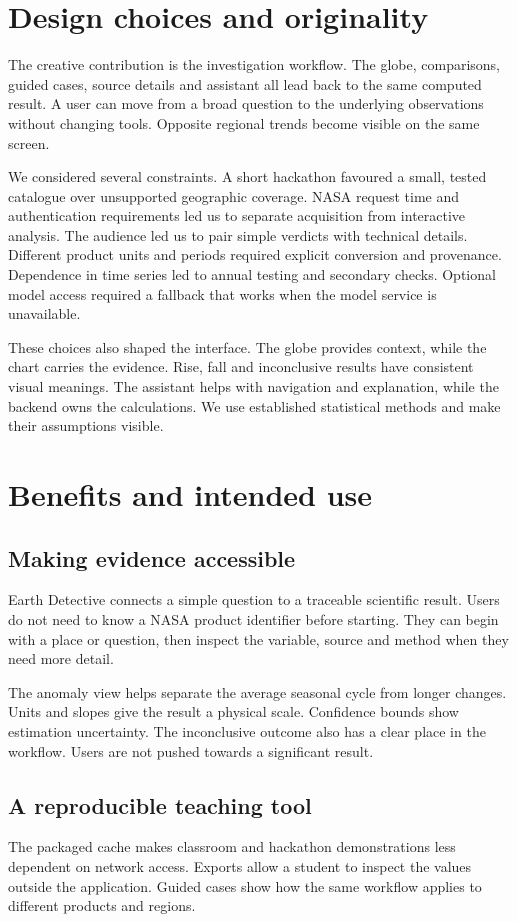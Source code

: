 \documentclass[10pt,a4paper,twocolumn]{article}
\begin{document}
\section{Design choices and originality}
The creative contribution is the investigation workflow. The globe, comparisons, guided cases, source details and assistant all lead back to the same computed result. A user can move from a broad question to the underlying observations without changing tools. Opposite regional trends become visible on the same screen.

We considered several constraints. A short hackathon favoured a small, tested catalogue over unsupported geographic coverage. NASA request time and authentication requirements led us to separate acquisition from interactive analysis. The audience led us to pair simple verdicts with technical details. Different product units and periods required explicit conversion and provenance. Dependence in time series led to annual testing and secondary checks. Optional model access required a fallback that works when the model service is unavailable.

These choices also shaped the interface. The globe provides context, while the chart carries the evidence. Rise, fall and inconclusive results have consistent visual meanings. The assistant helps with navigation and explanation, while the backend owns the calculations. We use established statistical methods and make their assumptions visible.

\section{Benefits and intended use}
\subsection{Making evidence accessible}
Earth Detective connects a simple question to a traceable scientific result. Users do not need to know a NASA product identifier before starting. They can begin with a place or question, then inspect the variable, source and method when they need more detail.

The anomaly view helps separate the average seasonal cycle from longer changes. Units and slopes give the result a physical scale. Confidence bounds show estimation uncertainty. The inconclusive outcome also has a clear place in the workflow. Users are not pushed towards a significant result.

\subsection{A reproducible teaching tool}
The packaged cache makes classroom and hackathon demonstrations less dependent on network access. Exports allow a student to inspect the values outside the application. Guided cases show how the same workflow applies to different products and regions.
\end{document}

